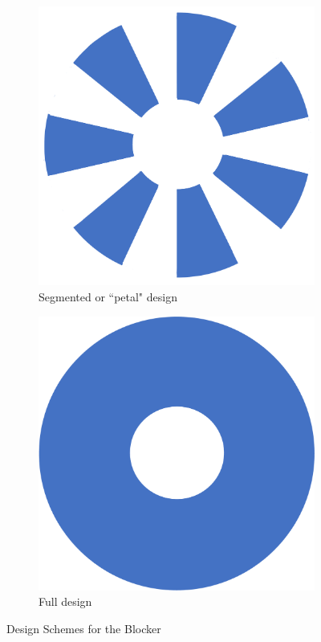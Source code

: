 \begin{figure}
     \centering
     \begin{subfigure}[b]{0.45\textwidth}
         \centering
         \includegraphics[width=\textwidth]{Images/SegBlocker.png}
         \caption{Segmented or ``petal" design}
         \label{fig:segBlocker}
     \end{subfigure}
     \hfill
     \begin{subfigure}[b]{0.45\textwidth}
         \centering
         \includegraphics[width=\textwidth]{Images/FullBlocker.png}
         \caption{Full design}
         \label{fig:fullBlocker}
     \end{subfigure}
     \caption{Design Schemes for the Blocker}
     \label{fig:blockerDesigns}
\end{figure}

